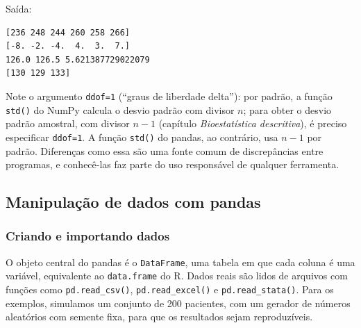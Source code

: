 \documentclass[
]{book}
\begin{document}
Saída:

\begin{verbatim}
[236 248 244 260 258 266]
[-8. -2. -4.  4.  3.  7.]
126.0 126.5 5.621387729022079
[130 129 133]
\end{verbatim}

Note o argumento \texttt{ddof=1} (``graus de liberdade delta''): por padrão, a função \texttt{std()} do NumPy calcula o desvio padrão com divisor \(n\); para obter o desvio padrão amostral, com divisor \(n - 1\) (capítulo \emph{Bioestatística descritiva}), é preciso especificar \texttt{ddof=1}. A função \texttt{std()} do pandas, ao contrário, usa \(n - 1\) por padrão. Diferenças como essa são uma fonte comum de discrepâncias entre programas, e conhecê-las faz parte do uso responsável de qualquer ferramenta.

\subsection{Manipulação de dados com pandas}\label{manipulauxe7uxe3o-de-dados-com-pandas}

\subsubsection{Criando e importando dados}\label{criando-e-importando-dados}

O objeto central do pandas é o \texttt{DataFrame}, uma tabela em que cada coluna é uma variável, equivalente ao \texttt{data.frame} do R. Dados reais são lidos de arquivos com funções como \texttt{pd.read\_csv()}, \texttt{pd.read\_excel()} e \texttt{pd.read\_stata()}. Para os exemplos, simulamos um conjunto de 200 pacientes, com um gerador de números aleatórios com semente fixa, para que os resultados sejam reproduzíveis.
\end{document}
